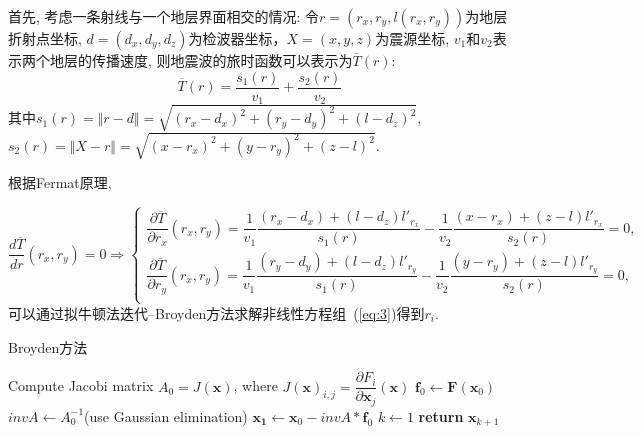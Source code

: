 \documentclass{article}
\begin{document}
\begin{CJK*}{UTF8}{gkai}
  
首先, 考虑一条射线与一个地层界面相交的情况: 令$r=(r_x,r_y,l(r_x,r_y))$为地层折射点坐标, $d=(d_x,d_y,d_z)$为检波器坐标，$X=(x,y,z)$为震源坐标, $v_1$和$v_2$表示两个地层的传播速度, 则地震波的旅时函数可以表示为$\overline{T}(r)$:
\begin{equation*}
\overline{T}(r) = \frac{s_1(r)}{v_1} +  \frac{s_{2}(r)}{v_{2}} 
\end{equation*}
其中$s_1(r) = \Vert r - d \Vert   = \sqrt{(r_x-d_x)^2 + (r_y - d_y)^2 + (l - d_z)^2}$, $s_{2}(r) = \Vert X - r \Vert = \sqrt{(x -r_x )^2 + (y - r_y)^2 + (z-l)^2}$.

根据Fermat原理, 

\begin{equation}\label{eq:3}
\frac{d \overline{T}}{d r}(r_x,r_y) =0 \Rightarrow
\begin{cases}
  \dfrac{\partial \overline{T}}{\partial r_x}(r_x,r_y) = \dfrac{1}{v_1} \dfrac{(r_x - d_x) + (l-d_z)l'_{r_x}}{s_1(r)}  - \dfrac{1}{v_2} \dfrac{(x-r_x) + (z-l)l'_{r_x}}{s_2(r)}= 0, \\
\dfrac{\partial \overline{T}}{\partial r_y} (r_x,r_y)= \dfrac{1}{v_1} \dfrac{(r_y - d_y) + (l-d_z)l'_{r_y}}{s_1(r)}  - \dfrac{1}{v_2} \dfrac{(y-r_y) + (z-l)l'_{r_y}}{s_2(r)}= 0, \\
\end{cases}
\end{equation}
可以通过拟牛顿法迭代--Broyden方法求解非线性方程组~(\ref{eq:3})得到$r_i$.

\begin{algorithm}[H]
\caption{Broyden方法}%
\LinesNumbered %

Compute Jacobi matrix $A_0=J(\mathbf{x})$, where $J(\mathbf{x})_{i,j} = \dfrac{\partial F_i}{\partial \mathbf{x}_j}(\mathbf{x})$\;
$\mathbf{f}_0 \leftarrow \mathbf{F}(\mathbf{x}_0)$\;
$invA \leftarrow A_0^{-1}$(use Gaussian elimination)\;
$\mathbf{x_1} \leftarrow \mathbf{x}_0 - invA * \mathbf{f}_0$ \;
$k \leftarrow 1$\;
  \textbf{return} $\mathbf{x}_{k+1}$\;
\end{algorithm}



\end{CJK*}
\end{document}
